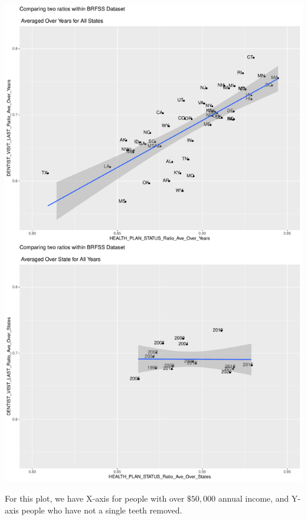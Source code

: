 \documentclass[
]{article}
\begin{document}
\includegraphics{BRFSS_Graphic_Reproduction_files/figure-latex/unnamed-chunk-10-1.pdf}

For this plot, we have X-axis for people with over \(\$50,000\) annual
income, and Y-axis people who have not a single teeth removed.
\end{document}
